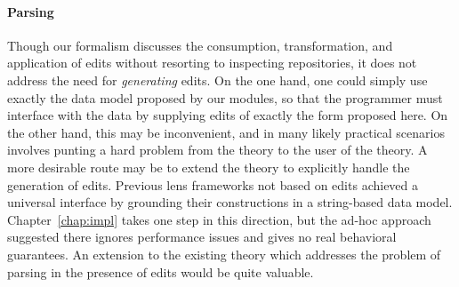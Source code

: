 \paragraph*{Parsing}
Though our formalism discusses the consumption, transformation, and
application of edits without resorting to inspecting repositories, it does
not address the need for \emph{generating} edits. On the one hand, one could
simply use exactly the data model proposed by our modules, so that the
programmer must interface with the data by supplying edits of exactly the
form proposed here. On the other hand, this may be inconvenient, and in many
likely practical scenarios involves punting a hard problem from the theory
to the user of the theory. A more desirable route may be to extend the
theory to explicitly handle the generation of edits. Previous lens
frameworks not based on edits achieved a universal interface by grounding
their constructions in a string-based data model. Chapter~\ref{chap:impl}
takes one step in this direction, but the ad-hoc approach suggested there
ignores performance issues and gives no real behavioral guarantees. An
extension to the existing theory which addresses the problem of parsing in
the presence of edits would be quite valuable.

